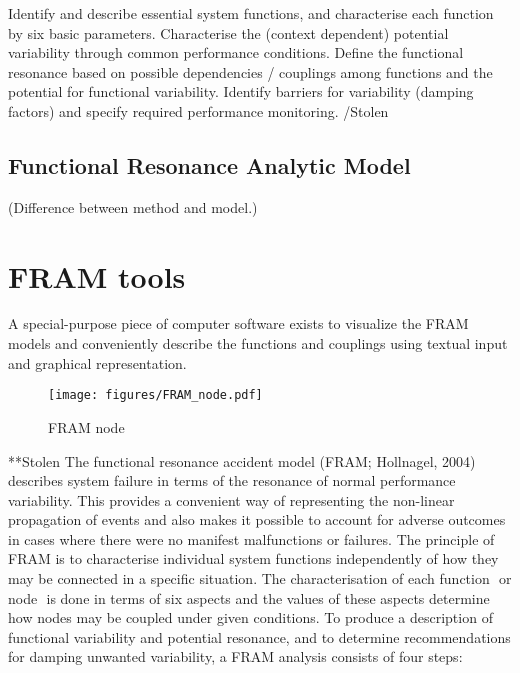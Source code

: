 Identify and describe essential system functions, and characterise each function by six basic parameters.
Characterise the (context dependent) potential variability through common performance conditions.
Define the functional resonance based on possible dependencies / couplings among functions and the potential for functional variability.
Identify barriers for variability (damping factors) and specify required performance monitoring.
/Stolen
\subsection{Functional Resonance Analytic Model}

(Difference between method and model.)


\section{FRAM tools}
A special-purpose piece of computer software exists to visualize the FRAM models and conveniently describe the functions and couplings using textual input and graphical representation.

\begin{figure}[h]
 \centering
   \texttt{[image: figures/FRAM\_node.pdf]}
 \caption{FRAM node}
 \label{fig:logbog}
\end{figure}



**Stolen
The functional resonance accident model (FRAM; Hollnagel, 2004) describes system failure
in terms of the resonance of normal performance variability. This provides a convenient way
of representing the non-linear propagation of events and also makes it possible to account for
adverse outcomes in cases where there were no manifest malfunctions or failures. The
principle of FRAM is to characterise individual system functions independently of how they
may be connected in a specific situation. The characterisation of each function ­ or node ­ is
done in terms of six aspects and the values of these aspects determine how nodes may be
coupled under given conditions. To produce a description of functional variability and
potential resonance, and to determine recommendations for damping unwanted variability, a
FRAM analysis consists of four steps:

